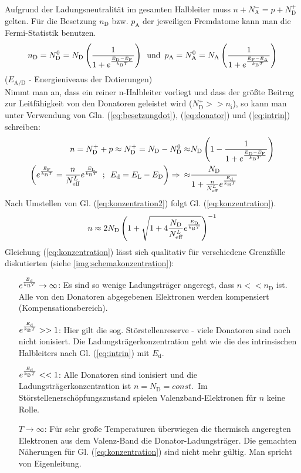 \documentclass[numbers=noenddot,14pt,a4paper]{scrartcl}
\newcommand{\ix}[1]{_\text{#1}}
\newcommand{\euler}{\mathnormal{e}}
\begin{document}
Aufgrund der Ladungsneutralität im gesamten Halbleiter muss \mbox{$n+N\ix{A}^-=p+N\ix{D}^+$} gelten. Für die Besetzung $n\ix{D}$ bzw. $p\ix{A}$ der jeweiligen Fremdatome kann man die Fermi-Statistik benutzen.
\begin{align}
	n\ix{D}=N\ix{D}^0=N\ix{D}\left(\frac{1}{1+\euler^{\frac{E\ix{D}-E\ix{F}}{k\ix{B}T}}}\right) \,\,\, \text{und} \,\,\, p\ix{A}=N\ix{A}^0=N\ix{A}\left(\frac{1}{1+\euler^{\frac{E\ix{F}-E\ix{A}}{k\ix{B}T}}}\right) \label{eq:besetzungdot}
\end{align}
($E\ix{A/D}$ - Energieniveaus der Dotierungen)\\
Nimmt man an, dass ein reiner n-Halbleiter vorliegt und dass der größte Beitrag zur Leitfähigkeit von den Donatoren geleistet wird ($N\ix{D}^+>>n\ix{i}$), so kann man unter Verwendung von Gln. (\ref{eq:besetzungdot}), (\ref{eq:donator})  und (\ref{eq:intrin}) schreiben:
\begin{align}
	n=N\ix{D}^++p\approx N\ix{D}^+=N\ix{D}-N\ix{D}^0\approx& N\ix{D}\left(1-\frac{1}{1+\euler^{\frac{E\ix{D}-E\ix{F}}{k\ix{B}T}}}\right) \nonumber \\
	\left(\euler^{\frac{E\ix{F}}{k\ix{B}T}}=\frac{n}{N\ix{eff}^L}\euler^{\frac{E\ix{L}}{k\ix{B}T}} \,\,\,;\,\,\, E\ix{d}=E\ix{L}-E\ix{D}\right) \Rightarrow \,\,\,\approx& \frac{N\ix{D}}{1+\frac{n}{N\ix{eff}^L}\euler^{\frac{E\ix{d}}{k\ix{B}T}}} \label{eq:konzentration2}
\end{align}
Nach Umstellen von Gl. (\ref{eq:konzentration2}) folgt Gl. (\ref{eq:konzentration}).
\begin{align}
	n\approx 2N\ix{D}\left(1+\sqrt{1+4\frac{N\ix{D}}{N\ix{eff}^L}\euler^{\frac{
		E\ix{D}}{k\ix{B}T}}}\right)^{-1} \label{eq:konzentration}
\end{align}
Gleichung (\ref{eq:konzentration}) lässt sich qualitativ für verschiedene Grenzfälle diskutierten (siehe \ref{img:schemakonzentration}):
\begin{itemize}
	\item[$\euler^\frac{E\ix{d}}{k\ix{B}T}\rightarrow\infty$:]
		{Es sind so wenige Ladungsträger angeregt, dass $n<<n\ix{D}$ ist. Alle von den Donatoren abgegebenen Elektronen werden kompensiert (Kompensationsbereich).}
	\item[$\euler^\frac{E\ix{d}}{k\ix{B}T}>>1$:]
		{Hier gilt die sog. Störstellenreserve - viele Donatoren sind noch nicht ionisiert. Die Ladungsträgerkonzentration geht wie die des intrinsischen Halbleiters nach Gl. (\ref{eq:intrin}) mit $E\ix{d}$.}
	\item[$\euler^\frac{E\ix{d}}{k\ix{B}T}<<1$:]
		{Alle Donatoren sind ionisiert und die Ladungsträgerkonzentration ist $n=N\ix{D}=const.\,$ Im Störstellenerschöpfungszustand spielen Valenzband-Elektronen für $n$ keine Rolle.}
	\item[$T\rightarrow\infty$:]
		{Für sehr große Temperaturen überwiegen die thermisch angeregten Elektronen aus dem Valenz-Band die Donator-Ladungsträger. Die gemachten Näherungen für Gl. (\ref{eq:konzentration}) sind nicht mehr gültig. Man spricht von Eigenleitung.}
\end{itemize}
\end{document}
